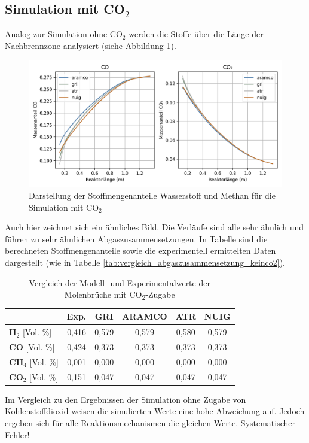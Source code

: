 \documentclass[footmark=none]{tubaf-thesis}
\begin{document}
        \subsection{Simulation mit CO$_2$}
        Analog zur Simulation ohne CO$_2$ werden die Stoffe über die Länge der Nachbrennzone analysiert (siehe Abbildung \ref{fig:vergleich_h2_ch4_co2}).
        \begin{figure}[H]
            \centering
            \includegraphics[width=1\linewidth]{img/Vergleich_mech/CO_CO2_CO2.png}
            \caption{Darstellung der Stoffmengenanteile Wasserstoff und Methan für die Simulation mit CO$_2$}
            \label{fig:vergleich_h2_ch4_co2}
        \end{figure}
        Auch hier zeichnet sich ein ähnliches Bild. Die Verläufe sind alle sehr ähnlich und führen zu sehr ähnlichen Abgaszusammensetzungen. In Tabelle sind die berechneten Stoffmengenanteile sowie die experimentell ermittelten Daten dargestellt (wie in Tabelle \ref{tab:vergleich_abgaszusammensetzung_keinco2}).
        \begin{table}[H]
            \centering
            \caption{Vergleich der Modell- und Experimentalwerte der Molenbrüche mit CO\textsubscript{2}-Zugabe}
            \begin{tabular}{lccccc}
                \toprule
                & \textbf{Exp.} & \textbf{GRI} & \textbf{ARAMCO} & \textbf{ATR} & \textbf{NUIG} \\
                \midrule
                \textbf{H$_2$} [Vol.-\%]& 0,416 & 0,579 & 0,579 & 0,580 & 0,579 \\
                \textbf{CO} [Vol.-\%]& 0,424 & 0,373 & 0,373 & 0,373 & 0,373 \\
                \textbf{CH$_4$} [Vol.-\%]& 0,001 & 0,000 & 0,000 & 0,000 & 0,000 \\
                \textbf{CO$_2$} [Vol.-\%]& 0,151 & 0,047 & 0,047 & 0,047 & 0,047 \\
                \bottomrule
            \end{tabular}
        \end{table}
        Im Vergleich zu den Ergebnissen der Simulation ohne Zugabe von Kohlenstoffdioxid weisen die simulierten Werte eine hohe Abweichung auf. Jedoch ergeben sich für alle Reaktionsmechanismen die gleichen Werte. \alert{Systematischer Fehler!}
    \pagebreak
    \printbibliography[heading=bibintoc,title=Quellenverzeichnis]
\end{document}

